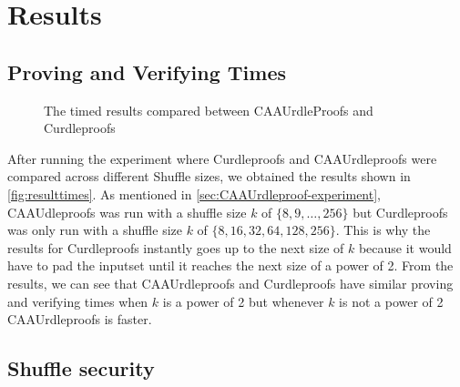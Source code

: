 \section{Results}\label{sec:results}
\subsection{Proving and Verifying Times}\label{subsec:results:provingverifying}
\begin{figure}[!htb]
    \centering
    \qquad
    \caption{The timed results compared between CAAUrdleProofs and Curdleproofs}%
    \label{fig:resulttimes}%
\end{figure}
After running the experiment where Curdleproofs and CAAUrdleproofs were compared across different Shuffle sizes, we obtained the results shown in \autoref{fig:resulttimes}.
As mentioned in \autoref{sec:CAAUrdleproof-experiment}, CAAUdleproofs was run with a shuffle size $k$ of $\{8,9,\dots,256\}$ but Curdleproofs was only run with a shuffle size $k$ of $\{8,16,32,64,128,256\}$.
This is why the results for Curdleproofs instantly goes up to the next size of $k$ because it would have to pad the inputset until it reaches the next size of a power of 2.
From the results, we can see that CAAUrdleproofs and Curdleproofs have similar proving and verifying times when $k$ is a power of 2 but whenever $k$ is not a power of 2 CAAUrdleproofs is faster.


\subsection{Shuffle security}\label{subsec:Shuffle-security}

